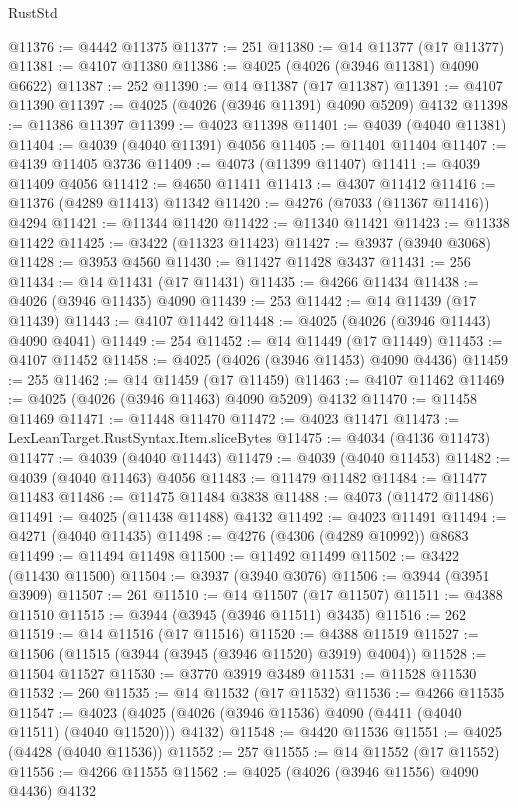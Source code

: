 \begin{lexlean}{RustStd}
\begin{coremodule}
@11376 := @4442 @11375
@11377 := 251
@11380 := @14 @11377 (@17 @11377)
@11381 := @4107 @11380
@11386 := @4025 (@4026 (@3946 @11381) @4090 @6622)
@11387 := 252
@11390 := @14 @11387 (@17 @11387)
@11391 := @4107 @11390
@11397 := @4025 (@4026 (@3946 @11391) @4090 @5209) @4132
@11398 := @11386 @11397
@11399 := @4023 @11398
@11401 := @4039 (@4040 @11381)
@11404 := @4039 (@4040 @11391) @4056
@11405 := @11401 @11404
@11407 := @4139 @11405 @3736
@11409 := @4073 (@11399 @11407)
@11411 := @4039 @11409 @4056
@11412 := @4650 @11411
@11413 := @4307 @11412
@11416 := @11376 (@4289 @11413) @11342
@11420 := @4276 (@7033 (@11367 @11416)) @4294
@11421 := @11344 @11420
@11422 := @11340 @11421
@11423 := @11338 @11422
@11425 := @3422 (@11323 @11423)
@11427 := @3937 (@3940 @3068)
@11428 := @3953 @4560
@11430 := @11427 @11428 @3437
@11431 := 256
@11434 := @14 @11431 (@17 @11431)
@11435 := @4266 @11434
@11438 := @4026 (@3946 @11435) @4090
@11439 := 253
@11442 := @14 @11439 (@17 @11439)
@11443 := @4107 @11442
@11448 := @4025 (@4026 (@3946 @11443) @4090 @4041)
@11449 := 254
@11452 := @14 @11449 (@17 @11449)
@11453 := @4107 @11452
@11458 := @4025 (@4026 (@3946 @11453) @4090 @4436)
@11459 := 255
@11462 := @14 @11459 (@17 @11459)
@11463 := @4107 @11462
@11469 := @4025 (@4026 (@3946 @11463) @4090 @5209) @4132
@11470 := @11458 @11469
@11471 := @11448 @11470
@11472 := @4023 @11471
@11473 := LexLeanTarget.RustSyntax.Item.sliceBytes
@11475 := @4034 (@4136 @11473)
@11477 := @4039 (@4040 @11443)
@11479 := @4039 (@4040 @11453)
@11482 := @4039 (@4040 @11463) @4056
@11483 := @11479 @11482
@11484 := @11477 @11483
@11486 := @11475 @11484 @3838
@11488 := @4073 (@11472 @11486)
@11491 := @4025 (@11438 @11488) @4132
@11492 := @4023 @11491
@11494 := @4271 (@4040 @11435)
@11498 := @4276 (@4306 (@4289 @10992)) @8683
@11499 := @11494 @11498
@11500 := @11492 @11499
@11502 := @3422 (@11430 @11500)
@11504 := @3937 (@3940 @3076)
@11506 := @3944 (@3951 @3909)
@11507 := 261
@11510 := @14 @11507 (@17 @11507)
@11511 := @4388 @11510
@11515 := @3944 (@3945 (@3946 @11511) @3435)
@11516 := 262
@11519 := @14 @11516 (@17 @11516)
@11520 := @4388 @11519
@11527 := @11506 (@11515 (@3944 (@3945 (@3946 @11520) @3919) @4004))
@11528 := @11504 @11527
@11530 := @3770 @3919 @3489
@11531 := @11528 @11530
@11532 := 260
@11535 := @14 @11532 (@17 @11532)
@11536 := @4266 @11535
@11547 := @4023 (@4025 (@4026 (@3946 @11536) @4090 (@4411 (@4040 @11511) (@4040 @11520))) @4132)
@11548 := @4420 @11536
@11551 := @4025 (@4428 (@4040 @11536))
@11552 := 257
@11555 := @14 @11552 (@17 @11552)
@11556 := @4266 @11555
@11562 := @4025 (@4026 (@3946 @11556) @4090 @4436) @4132

\end{coremodule}
\end{lexlean}
